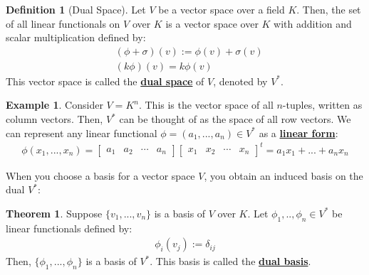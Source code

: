 \documentclass[11pt]{scrartcl}
\theoremstyle{definition}
\newtheorem{theorem}{Theorem}
\newtheorem{definition}{Definition}
\newtheorem{ex}{Example}
\theoremstyle{remark}
\newcommand{\dfn}[1]{\textbf{\underline{#1}}}
\begin{document}
{\begin{definition}[Dual Space]
	Let $V$ be a vector space over a field $K$. Then, the set of all linear functionals on $V$ over $K$ is a vector space over $K$ with addition and scalar multiplication defined by: 
	\begin{align*}
		& (\phi + \sigma)(v) := \phi(v) + \sigma(v)  \\
		& (k \phi)(v) = k \phi(v) 
	\end{align*}
	This vector space is called the \dfn{dual space} of $V$, denoted by $V^*$. 
\end{definition}

\begin{ex} 
Consider $V = K^n$. This is the vector space of all $n$-tuples, written as column vectors. Then, $V^*$ can be thought of as the space of all row vectors. We can represent any linear functional $\phi = (a_1, ..., a_n) \in V^*$ as a \dfn{linear form}: 
\begin{align*}
	\phi(x_1, ..., x_n) = \begin{bmatrix}
 	a_1 & a_2 & \cdots & a_n 	
 \end{bmatrix} \begin{bmatrix}
 	x_1 & x_2  & \cdots & x_n
 \end{bmatrix}^t = a_1 x_1 + ... + a_n x_n
\end{align*}	
\end{ex}

When you choose a basis for a vector space $V$, you obtain an induced basis on the dual $V^*$: 
\begin{theorem}
	Suppose $\{ v_1, ..., v_n \}$ is a basis of $V$ over $K$. Let $\phi_1 , .., \phi_n \in V^*$ be linear functionals defined by: 
	\begin{align}
		\phi_i(v_j) := \delta_{ij}	
	\end{align}
	Then, $\{ \phi_1, ..., \phi_n \}$ is a basis of $V^*$. This basis is called the \dfn{dual basis}. 
\end{theorem}

}
\end{document}
